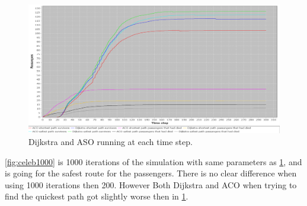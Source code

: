 


\begin{figure} [h]
\centering
\hspace*{-1.0in}
\includegraphics[scale=0.35]{images/Graph-using-200-rounds-140-passangers-and-one-fire.png}
\caption{Dijkstra and ASO running at each time step.}
\label{fig:celeb}
\end{figure}


\ref{fig:celeb1000} is 1000 iterations of the simulation with same parameters as \ref{fig:celeb}, and is going for the safest route for the passengers. There is no clear difference when using 1000 iterations then 200. However Both Dijkstra and ACO when trying to find the quickest path got slightly worse then in \ref{fig:celeb}.

